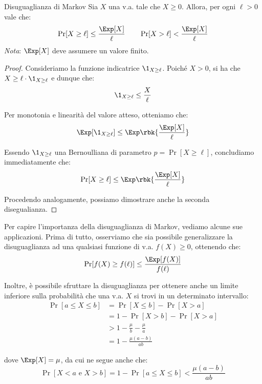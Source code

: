 \documentclass[a4paper, 12pt]{report}
\begin{document}
    \begin{framedthm}{Disuguaglianza di Markov}
        Sia $X$ una v.a. tale che $X \geq 0$. Allora, per ogni $\ell > 0$ vale che:
        \[\Pr[X \geq \ell] \leq \frac{\Exp[X]}{\ell} \qquad \Pr[X > \ell] < \frac{\Exp[X]}{\ell}\]
        \textit{Nota}: $\Exp[X]$ deve assumere un valore finito. 
    \end{framedthm}

    \begin{proof}
        Consideriamo la funzione indicatrice $\1_{X \geq \ell}$. Poiché $X > 0$, si ha che $X \geq \ell \cdot \1_{X \geq \ell}$ e dunque che:
        \[\1_{X \geq \ell} \leq \frac{X}{\ell}\]

        Per monotonia e linearità del valore atteso, otteniamo che:
        \[\Exp[\1_{X \geq \ell}] \leq \Exp \rbk{\frac{\Exp[X]}{\ell}}\]

        Essendo $\1_{X \geq \ell}$ una Bernoulliana di parametro $p = \Pr[X \geq \ell]$, concludiamo immediatamente che:
        \[\Pr[X \geq \ell] \leq \Exp \rbk{\frac{\Exp[X]}{\ell}}\]

        Procedendo analogamente, possiamo dimostrare anche la seconda disegualianza.
    \end{proof}

    Per capire l'importanza della disuguaglianza di Markov, vediamo alcune sue applicazioni. Prima di tutto, osserviamo che sia possibile generalizzare la disuguaglianza ad una qualsiasi funzione di v.a. $f(X) \geq 0$, ottenendo che:
    \[\Pr[f(X) \geq f(\ell)] \leq \frac{\Exp[f(X)]}{f(\ell)}\]

    Inoltre, è possibile sfruttare la disuguaglianza per ottenere anche un limite inferiore sulla probabilità che una v.a. $X$ si trovi in un determinato intervallo:
    \[\begin{split}
        \Pr[a \leq X \leq b] &= \Pr[X \leq b] - \Pr[X > a] \\
        &= 1 - \Pr[X > b] - \Pr[X > a]\\
        &> 1- \frac{\mu}{b} - \frac{\mu}{a} \\
        &= 1- \frac{\mu(a-b)}{ab}
    \end{split}\] 

    dove $\Exp[X] = \mu$, da cui ne segue anche che:
    \[\Pr[X < a \text{ e } X > b] = 1 - \Pr[a \leq X \leq b] < \frac{\mu(a-b)}{ab}\]
\end{document}
